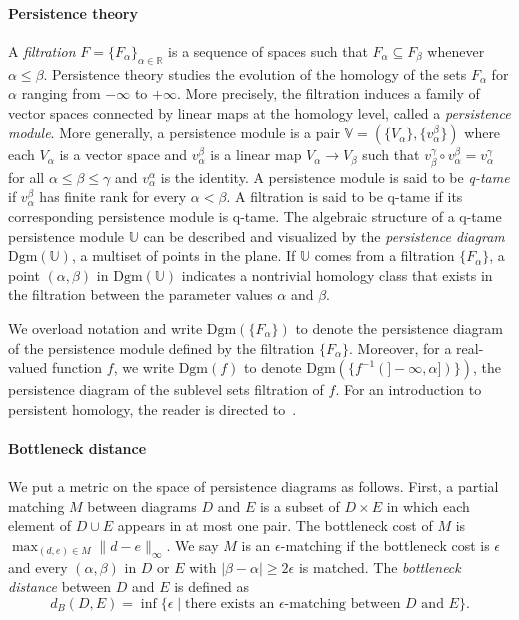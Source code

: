 \documentclass[a4paper]{article}
\newcommand\R{\mathbb{R}}
\newcommand\U{\mathbb{U}}
\newcommand\V{\mathbb{V}}
\newcommand\Dgm[1]{\mathrm{Dgm}(#1)}
\begin{document}
\paragraph{Persistence theory\\}
  A \emph{filtration} $F = \{F_\alpha\}_{\alpha\in\R}$ is a sequence of spaces such that $F_\alpha\subseteq F_\beta$ whenever $\alpha\leq\beta$.
  Persistence theory studies the evolution of the homology of the sets $F_\alpha$ for $\alpha$ ranging from $-\infty$ to $+\infty$.
  More precisely, the filtration induces a family of vector spaces connected by linear maps at the homology level, called a \emph{persistence module}.
  More generally, a persistence module is a pair $\V=(\{V_\alpha\},\{v_\alpha^\beta\})$ where each $V_\alpha$ is a vector space and $v_\alpha^\beta$ is a linear map $V_\alpha\to V_\beta$ such that $v_\beta^\gamma\circ v_\alpha^\beta = v_\alpha^\gamma$ for all $\alpha\le\beta\le \gamma$ and $v_\alpha^\alpha$ is the identity.
  A persistence module is said to be \emph{q-tame} if $v_\alpha^\beta$ has finite rank for every $\alpha<\beta$.
  A filtration is said to be q-tame if its corresponding persistence module is q-tame.
  The algebraic structure of a q-tame persistence module $\U$ can be described and visualized by the \emph{persistence diagram} $\Dgm{\U}$, a multiset of points in the plane.
  If $\U$ comes from a filtration $\{F_\alpha\}$, a point $(\alpha,\beta)$ in $\Dgm{\U}$ indicates a nontrivial homology class that exists in the filtration between the parameter values $\alpha$ and $\beta$.
  
  We overload notation and write $\Dgm{\{F_\alpha\}}$ to denote the persistence diagram of the persistence module defined by the filtration $\{F_\alpha\}$.
  Moreover, for a real-valued function $f$, we write $\Dgm{f}$ to denote $\Dgm{\{f^{-1}(]-\infty, \alpha])\}}$, the persistence diagram of the sublevel sets filtration of $f$.
  For an introduction to persistent homology, the reader is directed to~\cite{sspmCDGO,ctaiEH}.


\paragraph{Bottleneck distance\\}
  We put a metric on the space of persistence diagrams as follows.
  First, a partial matching $M$ between diagrams $D$ and $E$ is a subset of $D\times E$ in which each element of $D\cup E$ appears in at most one pair.
  The bottleneck cost of $M$ is $\max_{(d,e)\in M}\|d-e\|_{\infty}$.
  We say $M$ is an $\epsilon$-matching if the bottleneck cost is $\epsilon$ and every $(\alpha,\beta)$ in $D$ or $E$ with $|\beta-\alpha|\ge 2\epsilon$ is matched.
  The \emph{bottleneck distance} between $D$ and $E$ is defined as
  \[
    d_B(D,E) = \inf\{\epsilon \mid \text{there exists an $\epsilon$-matching between $D$ and $E$}\}.
  \]
\end{document}
